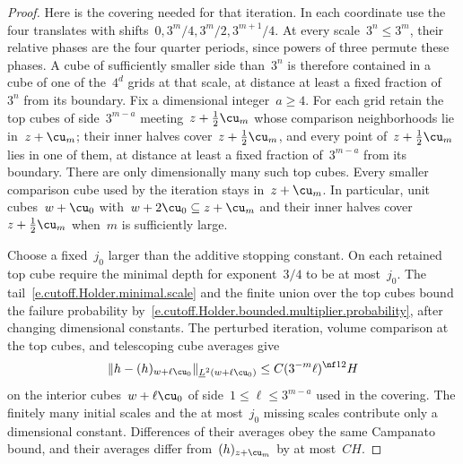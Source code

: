 \documentclass[11pt]{amsart}
\begin{document}
\begin{proof}
Here is the covering needed for that iteration. In each coordinate use the four translates with shifts~$0,3^m/4,3^m/2,3^{m+1}/4$. At every scale~$3^n\leq3^m$, their relative phases are the four quarter periods, since powers of three permute these phases. A cube of sufficiently smaller side than~$3^n$ is therefore contained in a cube of one of the~$4^d$ grids at that scale, at distance at least a fixed fraction of~$3^n$ from its boundary. Fix a dimensional integer~$a\geq4$. For each grid retain the top cubes of side~$3^{m-a}$ meeting~$z+\tfrac12\cu_m$ whose comparison neighborhoods lie in~$z+\cu_m$; their inner halves cover~$z+\tfrac12\cu_m$, and every point of~$z+\tfrac12\cu_m$ lies in one of them, at distance at least a fixed fraction of~$3^{m-a}$ from its boundary. There are only dimensionally many such top cubes. Every smaller comparison cube used by the iteration stays in~$z+\cu_m$. In particular, unit cubes~$w+\cu_0$ with~$w+2\cu_0\subseteq z+\cu_m$ and their inner halves cover~$z+\tfrac12\cu_m$ when~$m$ is sufficiently large.

\smallskip

Choose a fixed~$j_0$ larger than the additive stopping constant. On each retained top cube require the minimal depth for exponent~$3/4$ to be at most~$j_0$. The tail~\eqref{e.cutoff.Holder.minimal.scale} and the finite union over the top cubes bound the failure probability by~\eqref{e.cutoff.Holder.bounded.multiplier.probability}, after changing dimensional constants. The perturbed iteration, volume comparison at the top cubes, and telescoping cube averages give
\begin{equation*}
	\|h-(h)_{w+\ell\cu_0}\|_{\underline L^2(w+\ell\cu_0)}
	\leq C(3^{-m}\ell)^{\nf12}H
\end{equation*}
on the interior cubes~$w+\ell\cu_0$ of side~$1\leq\ell\leq3^{m-a}$ used in the covering. The finitely many initial scales and the at most~$j_0$ missing scales contribute only a dimensional constant. Differences of their averages obey the same Campanato bound, and their averages differ from~$(h)_{z+\cu_m}$ by at most~$CH$.

\smallskip


\end{proof}
\end{document}
